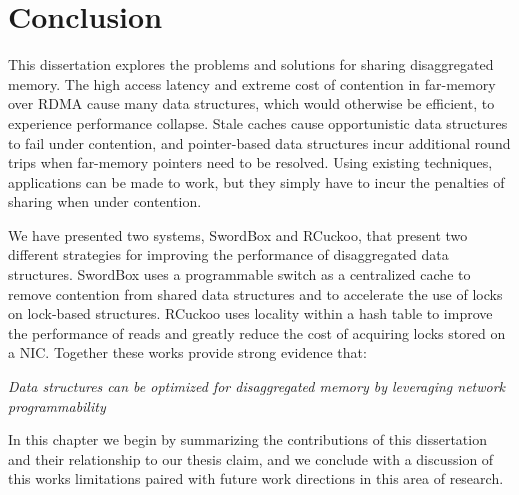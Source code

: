 \documentclass[12pt]{ucsddissertation}
\newcommand{\sword}{SwordBox}
\begin{document}

% 

%


%
% 



\chapter{Conclusion}

This dissertation explores the problems and solutions for sharing disaggregated memory. The high
access latency and extreme cost of contention in far-memory over RDMA cause many data structures,
which would otherwise be efficient, to experience performance collapse. Stale caches cause
opportunistic data structures to fail under contention, and pointer-based data structures incur
additional round trips when far-memory pointers need to be resolved. Using existing techniques,
applications can be made to work, but they simply have to incur the penalties of sharing when under
contention.

We have presented two systems, {\sword} and RCuckoo, that present two different strategies for
improving the performance of disaggregated data structures. {\sword} uses a programmable
switch as a centralized cache to remove contention from shared data structures and to accelerate the
use of locks on lock-based structures. RCuckoo uses locality within a hash table to improve the
performance of reads and greatly reduce the cost of acquiring locks stored on a NIC. Together these
works provide strong evidence that:


\begin{center}
\textit{Data structures can be optimized for disaggregated memory by leveraging network programmability} \\
\end{center}


In this chapter we begin by summarizing the contributions of this dissertation and their
relationship to our thesis claim, and we conclude with a discussion of this works limitations paired
with future work directions in this area of research.
\end{document}
